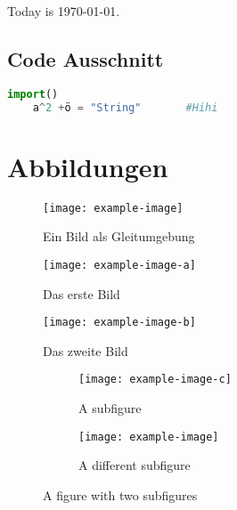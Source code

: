\documentclass[%
	paper		=	a4,							%
	fontsize	=	11pt,						%
	DIV			=	calc,						%
	twocolumn	=	false,						%
	twoside		=	false,						%
	headsepline	=	true,						%
]{scrreprt}										%
\begin{document}
Today is \today. \blindtext
{}


\section{Code Ausschnitt}

\begin{lstlisting}[language=python, caption={Ein Beispiel}, label={lst:1}]
	import()
	a^2 +ö = "String"		#Hihi
\end{lstlisting}




\chapter{Abbildungen}

\begin{together}

\blindtext

\begin{figure}[hbt]
	\centering
	\texttt{[image: example-image]}
	\caption{Ein Bild als Gleitumgebung}
	\label{fig:1}
\end{figure}
\end{together}

\blindtext

\begin{figure}[htb]
	\centering
	\begin{minipage}[t]{\imagewidth}
		\centering
		\texttt{[image: example-image-a]}
		\caption{Das erste Bild}
		\label{fig:2}
	\end{minipage}%
	\begin{minipage}[t]{\imagewidth}
		\centering
		\texttt{[image: example-image-b]}
		\caption{Das zweite Bild}
		\label{fig:3}
	\end{minipage}
\end{figure}

\blindtext

\begin{figure}
	\centering
	\begin{subfigure}[t]{\imagewidth}
  		\centering
  		\texttt{[image: example-image-c]}
  		\caption{A subfigure}
  		\label{fig:sub4}
	\end{subfigure}%
	\begin{subfigure}[t]{\imagewidth}
		\centering
		\texttt{[image: example-image]}
		\caption{A different subfigure}
  		\label{fig:sub5}
	\end{subfigure}
	\caption{A figure with two subfigures}
	\label{fig:4und5}
\end{figure}
\end{document}
